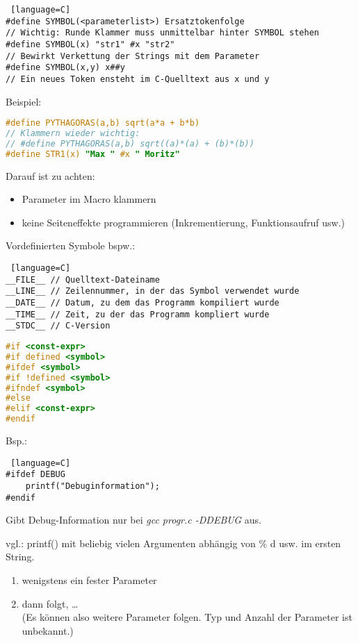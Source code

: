 \begin{multicols}{3}

\begin{lstlisting} [language=C]
#define SYMBOL(<parameterlist>)	Ersatztokenfolge
// Wichtig: Runde Klammer muss unmittelbar hinter SYMBOL stehen
#define SYMBOL(x) "str1" #x "str2"
// Bewirkt Verkettung der Strings mit dem Parameter
#define SYMBOL(x,y) x##y
// Ein neues Token ensteht im C-Quelltext aus x und y
\end{lstlisting}
Beispiel:
\begin{lstlisting}[language=C]
#define PYTHAGORAS(a,b) sqrt(a*a + b*b)
// Klammern wieder wichtig:
// #define PYTHAGORAS(a,b) sqrt((a)*(a) + (b)*(b))
#define STR1(x) "Max " #x " Moritz"
\end{lstlisting}
Darauf ist zu achten:
\begin{itemize}
\item Parameter im Macro klammern
\item keine Seiteneffekte programmieren (Inkrementierung, Funktionsaufruf usw.)
\end{itemize}
Vordefinierten Symbole bspw.:
\begin{lstlisting} [language=C]
__FILE__ // Quelltext-Dateiname
__LINE__ // Zeilennummer, in der das Symbol verwendet wurde
__DATE__ // Datum, zu dem das Programm kompiliert wurde
__TIME__ // Zeit, zu der das Programm kompliert wurde
__STDC__ // C-Version
\end{lstlisting}


\begin{lstlisting}[language=C]
#if <const-expr>
#if defined <symbol>
#ifdef <symbol>
#if !defined <symbol>
#ifndef <symbol>
#else 
#elif <const-expr>
#endif
\end{lstlisting}
Bsp.:
\begin{lstlisting} [language=C]
#ifdef DEBUG
	printf("Debuginformation");
#endif
\end{lstlisting}
Gibt Debug-Information nur bei \emph{gcc progr.c -DDEBUG} aus.

\HRule[4pt]

vgl.: printf() mit beliebig vielen Argumenten abhängig von \% d usw. im ersten String.
\begin{enumerate}
\item wenigstens ein fester Parameter
\item dann folgt, … \\
(Es können also weitere Parameter folgen. Typ und Anzahl der Parameter ist unbekannt.)
\end{enumerate}


\end{multicols}

